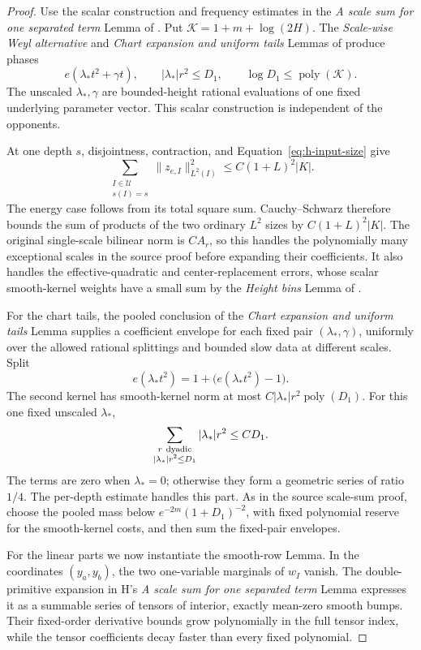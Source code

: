 \begin{proof}
Use the scalar construction and frequency estimates in the
\emph{A scale sum for one separated term} Lemma of
\cite[Section~5]{H}.  Put \(\mathcal K=1+m+\log(2H)\).
The \emph{Scale-wise Weyl alternative} and
\emph{Chart expansion and uniform tails} Lemmas of
\cite[Section~4]{H} produce phases
\[
 e(\lambda_*t^2+\gamma t),\qquad
 |\lambda_*|r^2\le D_1,\qquad \log D_1\le\operatorname{poly}(\mathcal K).
\]
The unscaled \(\lambda_*,\gamma\) are bounded-height rational
evaluations of one fixed underlying parameter vector.  This scalar
construction is independent of the opponents.

At one depth \(s\), disjointness, contraction, and
Equation~\eqref{eq:h-input-size} give
\[
 \sum_{\substack{I\in\mathcal U\\s(I)=s}}\|z_{e,I}\|_{L^2(I)}^2
 \le C(1+L)^2|K|.
\]
The energy case follows from its total square sum.  Cauchy--Schwarz
therefore bounds the sum of products of the two ordinary \(L^2\)
sizes by \(C(1+L)^2|K|\).  The original single-scale bilinear norm
is \(CA_r\), so this handles the polynomially many exceptional
scales in the source proof before expanding their coefficients.
It also handles the effective-quadratic and center-replacement
errors, whose scalar smooth-kernel weights have a small sum by the
\emph{Height bins} Lemma of \cite[Section~3]{H}.

For the chart tails, the pooled conclusion of the
\emph{Chart expansion and uniform tails} Lemma supplies a coefficient
envelope for each fixed pair \((\lambda_*,\gamma)\), uniformly over
the allowed rational splittings and bounded slow data at different
scales.  Split
\[
 e(\lambda_*t^2)=1+\bigl(e(\lambda_*t^2)-1\bigr).
\]
The second kernel has smooth-kernel norm at most
\(C|\lambda_*|r^2\operatorname{poly}(D_1)\).  For this one fixed
unscaled \(\lambda_*\),
\begin{equation}
 \sum_{\substack{r\ {\rm dyadic}\\|\lambda_*|r^2\le D_1}}
       |\lambda_*|r^2\le CD_1.                                \label{eq:hbase-quadratic-weight}
\end{equation}
The terms are zero when \(\lambda_*=0\); otherwise they form a
geometric series of ratio \(1/4\).  The per-depth estimate handles
this part.  As in the source scale-sum proof, choose the pooled mass
below \(e^{-2m}(1+D_1)^{-2}\), with fixed polynomial reserve for
the smooth-kernel costs, and then sum the fixed-pair envelopes.

For the linear parts we now instantiate the smooth-row Lemma.
In the coordinates \((y_a,y_b)\), the two one-variable marginals
of \(w_I\) vanish.  The double-primitive expansion in H's
\emph{A scale sum for one separated term} Lemma expresses it as a
summable series of tensors of interior, exactly mean-zero smooth
bumps.  Their fixed-order derivative bounds grow polynomially in
the full tensor index, while the tensor coefficients decay faster
than every fixed polynomial.


\end{proof}

